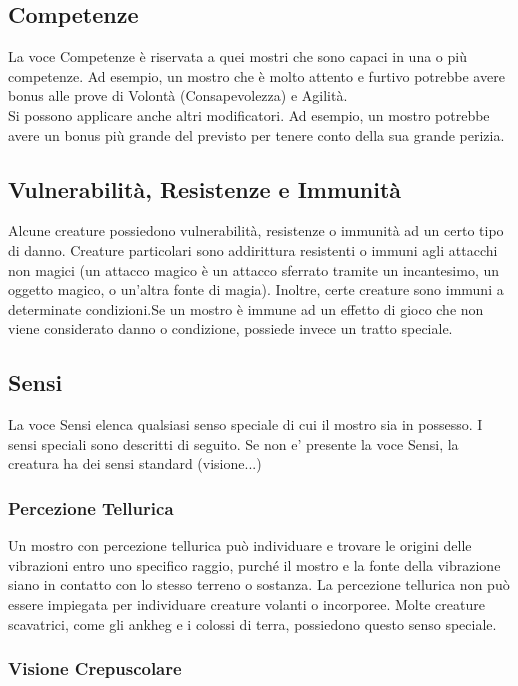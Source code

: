 \subsection{Competenze}

La voce Competenze è riservata a quei mostri che sono capaci in una o più competenze. Ad esempio, un mostro che è molto attento e furtivo potrebbe avere bonus alle prove di Volontà (Consapevolezza) e Agilità. \\
Si possono applicare anche altri modificatori. Ad esempio, un mostro potrebbe avere un bonus più grande del previsto per tenere conto della sua grande perizia.

\subsection{Vulnerabilità, Resistenze e Immunità}

Alcune creature possiedono vulnerabilità, resistenze o immunità ad un certo tipo di danno. Creature particolari sono addirittura resistenti o immuni agli attacchi non magici (un attacco magico è un attacco sferrato tramite un incantesimo, un oggetto magico, o un'altra fonte di magia). Inoltre, certe creature sono immuni a determinate condizioni.Se  un mostro è immune ad un effetto di gioco che non viene considerato danno o condizione, possiede invece un tratto speciale.

\subsection{Sensi}

La voce Sensi elenca qualsiasi senso speciale di cui il mostro sia in possesso. I sensi speciali sono descritti di seguito. Se non e' presente la voce Sensi, la creatura ha dei sensi standard (visione...)

\subsubsection{Percezione Tellurica}

Un mostro con percezione tellurica può individuare e trovare le origini delle vibrazioni entro uno specifico raggio, purché il mostro e la fonte della vibrazione siano in contatto con lo stesso terreno o sostanza. La percezione tellurica non può essere impiegata per individuare creature volanti o incorporee. Molte creature scavatrici, come gli ankheg e i colossi di terra, possiedono questo senso speciale.

\subsubsection{Visione Crepuscolare}

